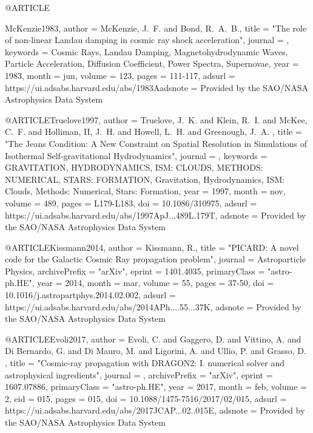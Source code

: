 \documentclass[useAMS,usenatbib]{mnras}
\begin{document}
@ARTICLE{McKenzie1983,
   author = {{McKenzie}, J.~F. and {Bond}, R.~A.~B.},
    title = "{The role of non-linear Landau damping in cosmic ray shock acceleration}",
  journal = {\aap},
 keywords = {Cosmic Rays, Landau Damping, Magnetohydrodynamic Waves, Particle Acceleration, Diffusion Coefficient, Power Spectra, Supernovae},
     year = 1983,
    month = jun,
   volume = 123,
    pages = {111-117},
   adsurl = {https://ui.adsabs.harvard.edu/abs/1983Aadsnote = {Provided by the SAO/NASA Astrophysics Data System}
}

@ARTICLE{Truelove1997,
   author = {{Truelove}, J.~K. and {Klein}, R.~I. and {McKee}, C.~F. and 
	{Holliman}, II, J.~H. and {Howell}, L.~H. and {Greenough}, J.~A.
	},
    title = "{The Jeans Condition: A New Constraint on Spatial Resolution in Simulations of Isothermal Self-gravitational Hydrodynamics}",
  journal = {\apjl},
 keywords = {GRAVITATION, HYDRODYNAMICS, ISM: CLOUDS, METHODS: NUMERICAL, STARS: FORMATION, Gravitation, Hydrodynamics, ISM: Clouds, Methods: Numerical, Stars: Formation},
     year = 1997,
    month = nov,
   volume = 489,
    pages = {L179-L183},
      doi = {10.1086/310975},
   adsurl = {https://ui.adsabs.harvard.edu/abs/1997ApJ...489L.179T},
  adsnote = {Provided by the SAO/NASA Astrophysics Data System}
}

@ARTICLE{Kissmann2014,
   author = {{Kissmann}, R.},
    title = "{PICARD: A novel code for the Galactic Cosmic Ray propagation problem}",
  journal = {Astroparticle Physics},
archivePrefix = "arXiv",
   eprint = {1401.4035},
 primaryClass = "astro-ph.HE",
     year = 2014,
    month = mar,
   volume = 55,
    pages = {37-50},
      doi = {10.1016/j.astropartphys.2014.02.002},
   adsurl = {https://ui.adsabs.harvard.edu/abs/2014APh....55...37K},
  adsnote = {Provided by the SAO/NASA Astrophysics Data System}
}

@ARTICLE{Evoli2017,
   author = {{Evoli}, C. and {Gaggero}, D. and {Vittino}, A. and {Di Bernardo}, G. and 
	{Di Mauro}, M. and {Ligorini}, A. and {Ullio}, P. and {Grasso}, D.
	},
    title = "{Cosmic-ray propagation with DRAGON2: I. numerical solver and astrophysical ingredients}",
  journal = {\jcap},
archivePrefix = "arXiv",
   eprint = {1607.07886},
 primaryClass = "astro-ph.HE",
     year = 2017,
    month = feb,
   volume = 2,
      eid = {015},
    pages = {015},
      doi = {10.1088/1475-7516/2017/02/015},
   adsurl = {https://ui.adsabs.harvard.edu/abs/2017JCAP...02..015E},
  adsnote = {Provided by the SAO/NASA Astrophysics Data System}
}

}
\end{document}
